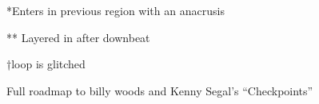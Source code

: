 \begin{sidewaystable}[t]
\vspace{0.2cm}
\hfill{*Enters in previous region with an anacrusis}

\hfill{** Layered in after downbeat}

\hfill{†loop is glitched}
    \caption{Full roadmap to billy woods and Kenny Segal's ``Checkpoints''}
    \label{tab:checkpointsfull}
\end{sidewaystable}